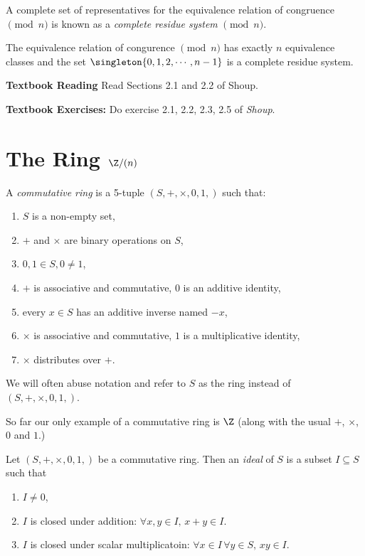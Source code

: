 \documentclass[oneside,12pt]{amsart}
\begin{document}
\bigskip

\begin{definition}
A complete set of representatives for the equivalence relation of congruence $\pmod n$ is known as a
\emph{complete residue system} $\pmod n$.
\end{definition}

\begin{lemma}
The equivalence relation of congurence $\pmod n$ has exactly $n$ equivalence classes and the set
$\singleton{0,1,2,\cdots, n-1}$ is a complete residue system.
\end{lemma}


\textbf{Textbook Reading} Read Sections 2.1 and 2.2 of Shoup.

\textbf{Textbook Exercises:} Do exercise 2.1, 2.2, 2.3, 2.5
of \emph{Shoup}.

\newpage

\section{The Ring $\Z/(n)$}

\begin{definition}
A \emph{commutative ring} is a 5-tuple $\left(S,+,\times,0,1,\right)$ such that:
\begin{enumerate}
\item $S$ is a non-empty set,
\item $+$ and $\times$ are binary operations on $S$,
\item $0,1\in S, 0\not=1$,
\item $+$ is associative and commutative, $0$ is an additive identity,
\item every $x\in S$ has an additive inverse named $-x$,
\item $\times$ is associative and commutative, $1$ is a multiplicative identity,
\item $\times$ distributes over $+$.
\end{enumerate}
\end{definition}

We will often abuse notation and refer to $S$ as the ring instead of $\left(S,+,\times,0,1,\right)$.

So far our only example of a commutative ring is $\Z$ (along with the usual $+$, $\times$, $0$ and $1$.) 

\begin{definition}
Let $\left(S,+,\times,0,1,\right)$ be a commutative ring. Then an \emph{ideal} of $S$ is a subset $I\subseteq S$ such that
\begin{enumerate}
\item $I\not=0$,
\item $I$ is closed under addition: $\forall x,y\in I, \, x+y\in I$.
\item $I$ is closed under scalar multiplicatoin: $\forall x\in I \, \forall y \in S, \, xy \in I$.
\end{enumerate}
\end{definition}
\end{document}
